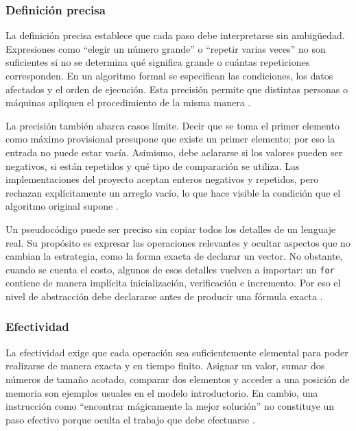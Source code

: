\documentclass[12pt,letterpaper]{article}
\newcommand{\codigo}[1]{\texttt{#1}}
\begin{document}
\subsubsection{Definición precisa}

La definición precisa establece que cada paso debe interpretarse sin ambigüedad. Expresiones como ``elegir un número grande'' o ``repetir varias veces'' no son suficientes si no se determina qué significa grande o cuántas repeticiones corresponden. En un algoritmo formal se especifican las condiciones, los datos afectados y el orden de ejecución. Esta precisión permite que distintas personas o máquinas apliquen el procedimiento de la misma manera \citep{zanabria2026,cormen2022,knuth1997}.

La precisión también abarca casos límite. Decir que se toma el primer elemento como máximo provisional presupone que existe un primer elemento; por eso la entrada no puede estar vacía. Asimismo, debe aclararse si los valores pueden ser negativos, si están repetidos y qué tipo de comparación se utiliza. Las implementaciones del proyecto aceptan enteros negativos y repetidos, pero rechazan explícitamente un arreglo vacío, lo que hace visible la condición que el algoritmo original supone \citep{goodrichpy2013,goodrichcpp2011,sedgewick2011}.

Un pseudocódigo puede ser preciso sin copiar todos los detalles de un lenguaje real. Su propósito es expresar las operaciones relevantes y ocultar aspectos que no cambian la estrategia, como la forma exacta de declarar un vector. No obstante, cuando se cuenta el costo, algunos de esos detalles vuelven a importar: un \codigo{for} contiene de manera implícita inicialización, verificación e incremento. Por eso el nivel de abstracción debe declararse antes de producir una fórmula exacta \citep{cormen2022,knuth1997,cook1973}.

\subsubsection{Efectividad}

La efectividad exige que cada operación sea suficientemente elemental para poder realizarse de manera exacta y en tiempo finito. Asignar un valor, sumar dos números de tamaño acotado, comparar dos elementos y acceder a una posición de memoria son ejemplos usuales en el modelo introductorio. En cambio, una instrucción como ``encontrar mágicamente la mejor solución'' no constituye un paso efectivo porque oculta el trabajo que debe efectuarse \citep{zanabria2026,cook1973,cormen2022}.
\end{document}
